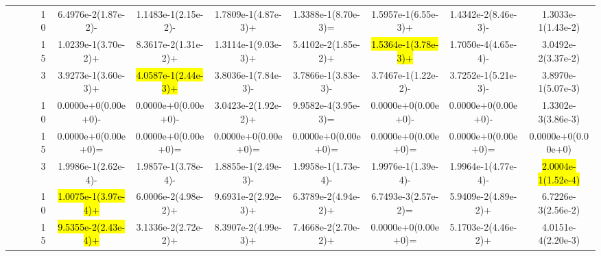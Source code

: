 \documentclass[a4paper,fleqn]{cas-dc}
\newcommand{\highlight}[1]{
	\begingroup
	\sethlcolor{Seashell}%
	\hl{#1}%
	\endgroup
}
\begin{document}
\begin{sloppypar}
\begin{table}[ht]
{\begin{tabular}{cccccccccc}
					\multirow{12}{*}{~}&\multirow{3}{*}{~} &10 &6.4976e-2(1.87e-2)-	&1.1483e-1(2.15e-2)-	&1.7809e-1(4.87e-3)+	&1.3388e-1(8.70e-3)=	&1.5957e-1(6.55e-3)+	&1.4342e-2(8.46e-3)-	&1.3033e-1(1.43e-2)\\
					
					\multirow{12}{*}{~}&\multirow{3}{*}{~} &15 &1.0239e-1(3.70e-2)+ &8.3617e-2(1.31e-2)+	&1.3114e-1(9.03e-3)+	&5.4102e-2(1.85e-2)+	&\highlight{1.5364e-1(3.78e-3)+}	&1.7050e-4(4.65e-4)-	&3.0492e-2(3.37e-2)\\
					
					
					
					
					
					\midrule[0.35pt]
					\multirow{9}{*}{Degenerated}&\multirow{3}{*}{WFG3}&3 &3.9273e-1(3.60e-3)+ &\highlight{4.0587e-1(2.44e-3)+}	&3.8036e-1(7.84e-3)-	&3.7866e-1(3.83e-3)-	&3.7467e-1(1.22e-2)-	&3.7252e-1(5.21e-3)-	&3.8970e-1(5.07e-3)\\ 
					
					\multirow{9}{*}{~}&\multirow{3}{*}{~} &10 &0.0000e+0(0.00e+0)-	&0.0000e+0(0.00e+0)-	&3.0423e-2(1.92e-2)+	&9.9582e-4(3.95e-3)=	&0.0000e+0(0.00e+0)-	&0.0000e+0(0.00e+0)-	&1.3302e-3(3.86e-3)\\
					
					\multirow{9}{*}{~}&\multirow{3}{*}{~} &15 &0.0000e+0(0.00e+0)= &0.0000e+0(0.00e+0)=	&0.0000e+0(0.00e+0)=	&0.0000e+0(0.00e+0)=	&0.0000e+0(0.00e+0)=	&0.0000e+0(0.00e+0)=	&0.0000e+0(0.00e+0)\\
					
					
					
					
					
					
					
					\multirow{9}{*}{~}&\multirow{3}{*}{MaF6} &3 &1.9986e-1(2.62e-4)- &1.9857e-1(3.78e-4)-	&1.8855e-1(2.49e-3)-	&1.9958e-1(1.73e-4)-	&1.9976e-1(1.39e-4)-	&1.9964e-1(4.77e-4)-	&\highlight{2.0004e-1(1.52e-4)}\\ 
					
					\multirow{9}{*}{~}&\multirow{3}{*}{~} &10 &\highlight{1.0075e-1(3.97e-4)+}	&6.0006e-2(4.98e-2)+	&9.6931e-2(2.92e-3)+	&6.3789e-2(4.94e-2)+	&6.7493e-3(2.57e-2)=	&5.9409e-2(4.89e-2)+	&6.7226e-3(2.56e-2)\\
					
					\multirow{9}{*}{~}&\multirow{3}{*}{~} &15 &\highlight{9.5355e-2(2.43e-4)+}	&3.1336e-2(2.72e-2)+	&8.3907e-2(4.99e-3)+	&7.4668e-2(2.70e-2)+	&0.0000e+0(0.00e+0)=	&5.1703e-2(4.46e-2)+	&4.0151e-4(2.20e-3)\\
					

\end{tabular}}
\end{table}
\end{sloppypar}
\end{document}
